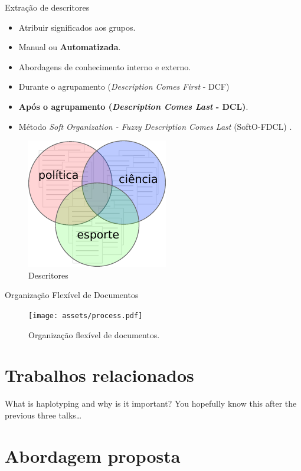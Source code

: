 \documentclass[brazil]{beamer}
\begin{document}
\begin{frame}{Extração de descritores}
  \begin{itemize}
    \item<1 -> Atribuir significados aos grupos. 
    \item<2 -> Manual ou \textbf{Automatizada}. 
    \item<3 -> Abordagens de conhecimento interno e externo.
    \item<4 -> Durante o agrupamento ({\it Description Comes First\/} - DCF) 
    \item<4 -> \textbf{Após o agrupamento ({\it Description Comes Last\/} - DCL)}.
    \item<5 -> Método {\it Soft Organization - Fuzzy Description Comes Last\/} (SoftO-FDCL)
      \cite{Nogueira2013}.
  \end{itemize} 
  \begin{figure}[!htp] 
    \centering 
    \includegraphics[width=0.4\columnwidth]{assets/descriptors.pdf}
    \caption{Descritores} 
  \end{figure}
\end{frame}

\begin{frame}{Organização Flexível de Documentos}
  \begin{figure}[!htp] 
    \centering 
    \texttt{[image: assets/process.pdf]}
    \caption{Organização flexível de documentos.} 
  \end{figure}
\end{frame}

\section{Trabalhos relacionados}

\begin{frame}{What is haplotyping and why is it important?}
  You hopefully know this after the previous three talks\dots
\end{frame}

\section{Abordagem proposta}
\end{document}
